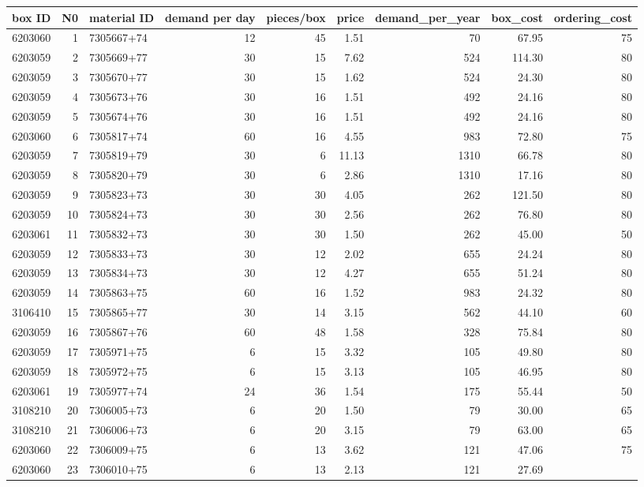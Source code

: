 \documentclass[
]{article}
\newenvironment{Shaded}{\begin{snugshade}}{\end{snugshade}}
\newcommand{\DataTypeTok}[1]{\textcolor[rgb]{0.13,0.29,0.53}{#1}}
\newcommand{\DecValTok}[1]{\textcolor[rgb]{0.00,0.00,0.81}{#1}}
\newcommand{\KeywordTok}[1]{\textcolor[rgb]{0.13,0.29,0.53}{\textbf{#1}}}
\newcommand{\NormalTok}[1]{#1}
\newcommand{\OperatorTok}[1]{\textcolor[rgb]{0.81,0.36,0.00}{\textbf{#1}}}
\newcommand{\StringTok}[1]{\textcolor[rgb]{0.31,0.60,0.02}{#1}}
\begin{document}
\begin{Shaded}
\end{Shaded}

\begin{longtable}[]{@{}rrlrrrrrr@{}}
\toprule
box ID & N0 & material ID & demand per day & pieces/box & price &
demand\_per\_year & box\_cost & ordering\_cost\tabularnewline
\midrule
\endhead
6203060 & 1 & 7305667+74 & 12 & 45 & 1.51 & 70 & 67.95 &
75\tabularnewline
6203059 & 2 & 7305669+77 & 30 & 15 & 7.62 & 524 & 114.30 &
80\tabularnewline
6203059 & 3 & 7305670+77 & 30 & 15 & 1.62 & 524 & 24.30 &
80\tabularnewline
6203059 & 4 & 7305673+76 & 30 & 16 & 1.51 & 492 & 24.16 &
80\tabularnewline
6203059 & 5 & 7305674+76 & 30 & 16 & 1.51 & 492 & 24.16 &
80\tabularnewline
6203060 & 6 & 7305817+74 & 60 & 16 & 4.55 & 983 & 72.80 &
75\tabularnewline
6203059 & 7 & 7305819+79 & 30 & 6 & 11.13 & 1310 & 66.78 &
80\tabularnewline
6203059 & 8 & 7305820+79 & 30 & 6 & 2.86 & 1310 & 17.16 &
80\tabularnewline
6203059 & 9 & 7305823+73 & 30 & 30 & 4.05 & 262 & 121.50 &
80\tabularnewline
6203059 & 10 & 7305824+73 & 30 & 30 & 2.56 & 262 & 76.80 &
80\tabularnewline
6203061 & 11 & 7305832+73 & 30 & 30 & 1.50 & 262 & 45.00 &
50\tabularnewline
6203059 & 12 & 7305833+73 & 30 & 12 & 2.02 & 655 & 24.24 &
80\tabularnewline
6203059 & 13 & 7305834+73 & 30 & 12 & 4.27 & 655 & 51.24 &
80\tabularnewline
6203059 & 14 & 7305863+75 & 60 & 16 & 1.52 & 983 & 24.32 &
80\tabularnewline
3106410 & 15 & 7305865+77 & 30 & 14 & 3.15 & 562 & 44.10 &
60\tabularnewline
6203059 & 16 & 7305867+76 & 60 & 48 & 1.58 & 328 & 75.84 &
80\tabularnewline
6203059 & 17 & 7305971+75 & 6 & 15 & 3.32 & 105 & 49.80 &
80\tabularnewline
6203059 & 18 & 7305972+75 & 6 & 15 & 3.13 & 105 & 46.95 &
80\tabularnewline
6203061 & 19 & 7305977+74 & 24 & 36 & 1.54 & 175 & 55.44 &
50\tabularnewline
3108210 & 20 & 7306005+73 & 6 & 20 & 1.50 & 79 & 30.00 &
65\tabularnewline
3108210 & 21 & 7306006+73 & 6 & 20 & 3.15 & 79 & 63.00 &
65\tabularnewline
6203060 & 22 & 7306009+75 & 6 & 13 & 3.62 & 121 & 47.06 &
75\tabularnewline
6203060 & 23 & 7306010+75 & 6 & 13 & 2.13 & 121 & 27.69 &

\end{longtable}
\end{document}
